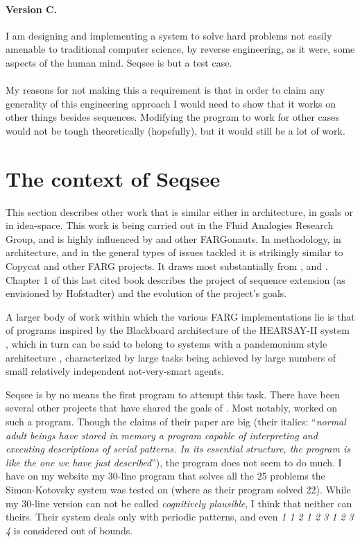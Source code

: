\documentclass[letterpaper]{article}
\begin{document}
\paragraph{Version C.}  I am designing and implementing a system to solve hard problems not easily amenable to traditional computer science, by reverse engineering, as it were, some aspects of the human mind.  Seqsee is but a test case.

\paragraph{} My reasons for not making this a requirement is that in order to claim any generality of this engineering approach I would need to show that it works on other things besides sequences.  Modifying the program to work for other cases would not be tough theoretically (hopefully), but it would still be a lot of work.

\tableofcontents

\section{The context of Seqsee}
\label{sec:context}

This section describes other work that is similar either in architecture, in goals or in idea-space. This work is being carried out in the Fluid Analogies Research Group, and is highly influenced by \hof and other FARGonauts. In methodology, in architecture, and in the general types of issues tackled it is strikingly similar to Copycat and other FARG projects. It draws most substantially from ,  and . Chapter 1 of this last cited book describes the project of sequence extension (as envisioned by Hofstadter) and the evolution of the project's goals.

A larger body of work within which the various FARG implementations lie is that of programs inspired by the Blackboard architecture of the HEARSAY-II system \cite{Reddy}, which in turn can be said to belong to systems with a pandemonium style architecture \cite{Dennett:Consciousness}, characterized by large tasks being achieved by large numbers of small relatively independent not-very-smart agents. 

Seqsee is by no means the first program to attempt this task. There have been several other projects that have shared the  goals of \seq. Most notably,  worked on such a program. Though the claims of their paper are big (their italics: ``\emph{normal adult beings have stored in memory a program capable of interpreting and executing descriptions of serial patterns. In its essential structure, the program is like the one we have just described}''), the program does not seem to do much. I have on my website \cite{Mahabal:simon} my 30-line program that solves all the 25 problems the Simon-Kotovsky system was tested on (where as their program solved 22). While my 30-line version can not be called \emph{cognitively plausible}, I think that neither can theirs. Their system deals only with periodic patterns, and even \emph{1 1 2 1 2 3 1 2 3 4} is considered out of bounds.
\end{document}
